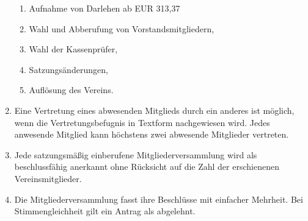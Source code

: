 \documentclass[a4paper,ngerman]{scrartcl}
\begin{document}
\begin{enumerate}
\begin{enumerate}
\item Aufnahme von Darlehen ab EUR 313,37
\item Wahl und Abberufung von Vorstandsmitgliedern,
\item Wahl der Kassenprüfer,
\item Satzungsänderungen,
\item Auflösung des Vereins.
\end{enumerate}
\item Eine Vertretung eines abwesenden Mitglieds durch ein anderes ist möglich, wenn die Vertretungsbefugnis in Textform nachgewiesen wird. Jedes anwesende Mitglied kann höchstens zwei abwesende Mitglieder vertreten.
\item Jede satzungsmäßig einberufene Mitgliederversammlung wird als beschlussfähig anerkannt ohne Rücksicht auf die Zahl der erschienenen Vereinsmitglieder.
\item Die Mitgliederversammlung fasst ihre Beschlüsse mit einfacher Mehrheit. Bei Stimmengleichheit gilt ein Antrag als abgelehnt.
\end{enumerate}
\end{document}
